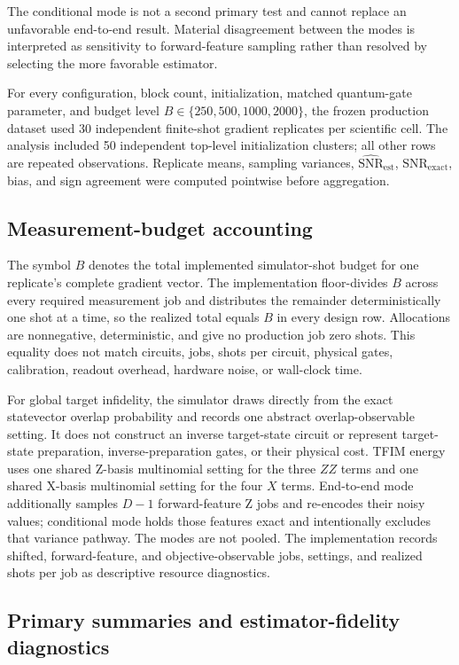 \documentclass[pdflatex,sn-basic,Numbered]{sn-jnl}
\newcommand{\snrest}{\widehat{\mathrm{SNR}}_{\mathrm{est}}}
\newcommand{\snrexact}{\mathrm{SNR}_{\mathrm{exact}}}
\begin{document}
The conditional mode is not a second primary test and cannot replace an unfavorable end-to-end result. Material disagreement between the modes is interpreted as sensitivity to forward-feature sampling rather than resolved by selecting the more favorable estimator.

For every configuration, block count, initialization, matched quantum-gate parameter, and budget level $B\in\{250,500,1000,2000\}$, the frozen production dataset used 30 independent finite-shot gradient replicates per scientific cell. The analysis included 50 independent top-level initialization clusters; all other rows are repeated observations. Replicate means, sampling variances, $\snrest$, $\snrexact$, bias, and sign agreement were computed pointwise before aggregation.

\subsection{Measurement-budget accounting}
\label{sec:budget}

The symbol $B$ denotes the total implemented simulator-shot budget for one replicate's complete gradient vector. The implementation floor-divides $B$ across every required measurement job and distributes the remainder deterministically one shot at a time, so the realized total equals $B$ in every design row. Allocations are nonnegative, deterministic, and give no production job zero shots. This equality does not match circuits, jobs, shots per circuit, physical gates, calibration, readout overhead, hardware noise, or wall-clock time.

For global target infidelity, the simulator draws directly from the exact statevector overlap probability and records one abstract overlap-observable setting. It does not construct an inverse target-state circuit or represent target-state preparation, inverse-preparation gates, or their physical cost. TFIM energy uses one shared Z-basis multinomial setting for the three $ZZ$ terms and one shared X-basis multinomial setting for the four $X$ terms. End-to-end mode additionally samples $D-1$ forward-feature Z jobs and re-encodes their noisy values; conditional mode holds those features exact and intentionally excludes that variance pathway. The modes are not pooled. The implementation records shifted, forward-feature, and objective-observable jobs, settings, and realized shots per job as descriptive resource diagnostics.

\subsection{Primary summaries and estimator-fidelity diagnostics}
\end{document}

